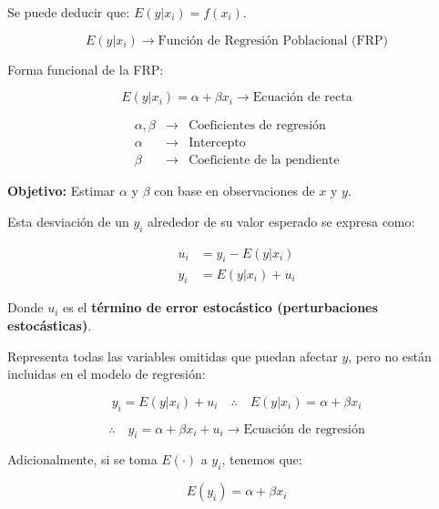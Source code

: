 \documentclass[
]{book}
\begin{document}
Se puede deducir que: \(E(y|x_i) = f(x_i)\).

\[
E(y|x_i) \rightarrow \text{Función de Regresión Poblacional (FRP)}
\]

Forma funcional de la FRP:

\[
E(y|x_i) = \alpha + \beta x_i \rightarrow \text{Ecuación de recta}
\]

\[
\begin{array}{rcl}
\alpha, \beta & \rightarrow & \text{Coeficientes de regresión} \\
\alpha & \rightarrow & \text{Intercepto} \\
\beta & \rightarrow & \text{Coeficiente de la pendiente}
\end{array}
\]

\textbf{Objetivo:} Estimar \(\alpha\) y \(\beta\) con base en observaciones de \(x\) y \(y\).

Esta desviación de un \(y_i\) alrededor de su valor esperado se expresa como:

\[
\begin{align*}
u_i &= y_i - E(y|x_i) \\
y_i &= E(y|x_i) + u_i
\end{align*}
\]

Donde \(u_i\) es el \textbf{término de error estocástico (perturbaciones estocásticas)}.

Representa todas las variables omitidas que puedan afectar \(y\), pero no están incluidas en el modelo de regresión:

\[
y_i = E(y|x_i) + u_i \quad \therefore \quad E(y|x_i) = \alpha + \beta x_i
\]

\[
\therefore \quad y_i = \alpha + \beta x_i + u_i \rightarrow \text{Ecuación de regresión}
\]

Adicionalmente, si se toma \(E(\cdot)\) a \(y_i\), tenemos que:

\[
E(y_i) = \alpha + \beta x_i
\]

  
\end{document}
